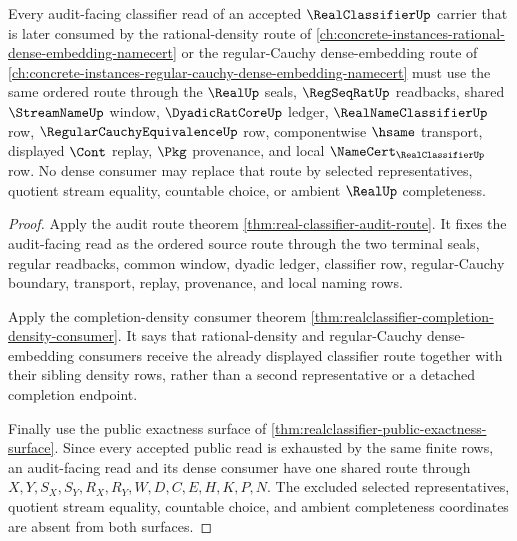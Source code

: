 \begin{theorem}
\label{thm:real-classifier-audit-density-coherence}
Every audit-facing classifier read of an accepted $\RealClassifierUp$ carrier that is later consumed by the rational-density route of \autoref{ch:concrete-instances-rational-dense-embedding-namecert} or the regular-Cauchy dense-embedding route of \autoref{ch:concrete-instances-regular-cauchy-dense-embedding-namecert} must use the same ordered route through the $\RealUp$ seals, $\RegSeqRatUp$ readbacks, shared $\StreamNameUp$ window, $\DyadicRatCoreUp$ ledger, $\RealNameClassifierUp$ row, $\RegularCauchyEquivalenceUp$ row, componentwise $\hsame$ transport, displayed $\Cont$ replay, $\Pkg$ provenance, and local $\NameCert_{\RealClassifierUp}$ row. No dense consumer may replace that route by selected representatives, quotient stream equality, countable choice, or ambient $\RealUp$ completeness.
\end{theorem}
\begin{proof}
Apply the audit route theorem \autoref{thm:real-classifier-audit-route}. It fixes the audit-facing read as the ordered source route through the two terminal seals, regular readbacks, common window, dyadic ledger, classifier row, regular-Cauchy boundary, transport, replay, provenance, and local naming rows.

Apply the completion-density consumer theorem \autoref{thm:realclassifier-completion-density-consumer}. It says that rational-density and regular-Cauchy dense-embedding consumers receive the already displayed classifier route together with their sibling density rows, rather than a second representative or a detached completion endpoint.

Finally use the public exactness surface of \autoref{thm:realclassifier-public-exactness-surface}. Since every accepted public read is exhausted by the same finite rows, an audit-facing read and its dense consumer have one shared route through $X,Y,S_X,S_Y,R_X,R_Y,W,D,C,E,H,K,P,N$. The excluded selected representatives, quotient stream equality, countable choice, and ambient completeness coordinates are absent from both surfaces.
\end{proof}

